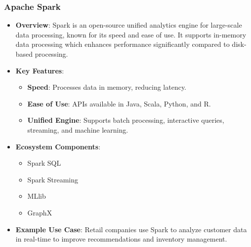 \documentclass[aspectratio=169]{beamer}
\begin{document}
\begin{frame}[fragile]
    \frametitle{Apache Spark}
    
    \begin{itemize}
        \item \textbf{Overview}: 
        Spark is an open-source unified analytics engine for large-scale data processing, known for its speed and ease of use. It supports in-memory data processing which enhances performance significantly compared to disk-based processing.
        
        \item \textbf{Key Features}:
        \begin{itemize}
            \item \textbf{Speed}: Processes data in memory, reducing latency.
            \item \textbf{Ease of Use}: APIs available in Java, Scala, Python, and R.
            \item \textbf{Unified Engine}: Supports batch processing, interactive queries, streaming, and machine learning.
        \end{itemize}
        
        \item \textbf{Ecosystem Components}:
        \begin{itemize}
            \item Spark SQL
            \item Spark Streaming
            \item MLlib
            \item GraphX
        \end{itemize}

        \item \textbf{Example Use Case}:
        Retail companies use Spark to analyze customer data in real-time to improve recommendations and inventory management.
    \end{itemize}
\end{frame}
\end{document}
